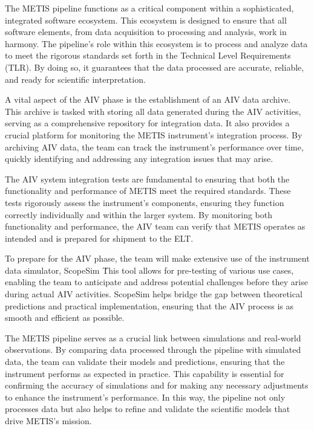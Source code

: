 \documentclass[a4paper]{spie}  %
\begin{document}
The METIS pipeline functions as a critical component within a sophisticated, integrated software ecosystem. This ecosystem is designed to ensure that all software elements, from data acquisition to processing and analysis, work in harmony. The pipeline's role within this ecosystem is to process and analyze data to meet the rigorous standards set forth in the Technical Level Requirements (TLR). By doing so, it guarantees that the data processed are accurate, reliable, and ready for scientific interpretation.

A vital aspect of the AIV phase is the establishment of an AIV data archive. This archive is tasked with storing all data generated during the AIV activities, serving as a comprehensive repository for integration data. It also provides a crucial platform for monitoring the METIS instrument's integration process. By archiving AIV data, the team can track the instrument's performance over time, quickly identifying and addressing any integration issues that may arise.

The AIV system integration tests are fundamental to ensuring that both the functionality and performance of METIS meet the required standards. These tests rigorously assess the instrument's components, ensuring they function correctly individually and within the larger system. By monitoring both functionality and performance, the AIV team can verify that METIS operates as intended and is prepared for shipment to the ELT.

To prepare for the AIV phase, the team will make extensive use of the instrument data simulator, ScopeSim \. This tool allows for pre-testing of various use cases, enabling the team to anticipate and address potential challenges before they arise during actual AIV activities. ScopeSim helps bridge the gap between theoretical predictions and practical implementation, ensuring that the AIV process is as smooth and efficient as possible.

The METIS pipeline serves as a crucial link between simulations and real-world observations. By comparing data processed through the pipeline with simulated data, the team can validate their models and predictions, ensuring that the instrument performs as expected in practice. This capability is essential for confirming the accuracy of simulations and for making any necessary adjustments to enhance the instrument's performance. In this way, the pipeline not only processes data but also helps to refine and validate the scientific models that drive METIS's mission.
\end{document}
